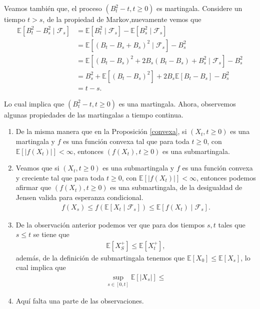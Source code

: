 Veamos también que, el proceso $(B_t^2 - t, t \geq 0)$ es martingala. Considere un tiempo $t > s$, de la propiedad de Markov,nuevamente vemos que
\begin{align*}
	\mathbb{E} \left[B_t^2 - B_s^2 \mid \mathcal{F}_s \right] & = \mathbb{E}\left[B_t^2 \mid \mathcal{F}_s\right] - \mathbb{E}\left[B_s^2 \mid \mathcal{F}_s\right] \\
    & = \mathbb{E} \left[ \left(B_t - B_s + B_s \right)^2 \mid \mathcal{F}_s \right] - B_s^2 \\
    & = \mathbb{E} \left[ \left(B_t - B_s \right)^2 + 2 B_s \left(B_t - B_s \right) + B_s^2 \mid \mathcal{F}_s \right] - B_s^2 \\
    & = B_s^2 + \mathbb{E} \left[ \left(B_t - B_s \right)^2 \right] + 2B_s \mathbb{E} \left[B_t - B_s \right] - B_s^2 \\
    & = t - s.
\end{align*}

Lo cual implica que $(B_t^2 - t, t \geq 0)$ es una martingala. Ahora, observemos algunas propiedades de las martingalas a tiempo continua. \\

\begin{enumerate}
	\item De la misma manera que en la Proposición \ref{convexa}, si $(X_t, t \geq 0)$ es una martingala y $f$ es una función convexa tal que para toda $t \geq 0$, con $\mathbb{E}[|f(X_t)|] < \infty$, entonces $(f(X_t), t \geq 0)$ es una submartingala. \\
    
    \item Veamos que si $(X_t, t \geq 0)$ es una submartingala y $f$ es una función convexa y creciente tal que para toda $t \geq 0$, con $\mathbb{E}[|f(X_t)|] < \infty$, entonces podemos afirmar que $(f(X_t), t \geq 0)$ es una submartingala, de la desigualdad de Jensen valida para esperanza condicional.
    \begin{align*}
		f(X_s) \leq f \left( \mathbb{E} [X_t \mid \mathcal{F}_s] \right) \leq \mathbb{E} [f(X_t) \mid \mathcal{F}_s].
	\end{align*}
    
    \item De la observación anterior podemos ver que para dos tiempos $s, t$ tales que $s \leq t$ se tiene que
    \begin{align*}
		\mathbb{E} [X_S^{+}] \leq \mathbb{E} [X_t^{+}],
	\end{align*}
    además, de la definición de submartingala tenemos que $\mathbb{E}[X_0] \leq \mathbb{E}[X_s ]$, lo cual implica que
    \begin{align*}
		\sup_{s \in [0, t]} \mathbb{E} \left[ |X_s| \right] \leq 
	\end{align*}
    
    \item Aquí falta una parte de las observaciones.
\end{enumerate}

